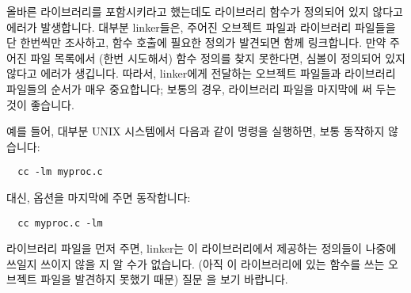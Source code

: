 \begin{faq}
	올바른 라이브러리를 포함시키라고 했는데도 라이브러리 함수가
	정의되어 있지 않다고 에러가 발생합니다.
\A
	대부분 linker들은, 주어진 오브젝트 파일과 라이브러리 파일들을
        단 한번씩만 조사하고, 함수 호출에 필요한 정의가 발견되면 함께
        링크합니다. 만약 주어진 파일 목록에서 (한번 시도해서) 함수 정의를
        찾지 못한다면, 심볼이 정의되어 있지 않다고 에러가 생깁니다.
        따라서, linker에게 전달하는 오브젝트 파일들과 라이브러리 파일들의
        순서가 매우 중요합니다; 보통의 경우, 라이브러리 파일을 마지막에 
        써 두는 것이 좋습니다.

        예를 들어, 대부분 UNIX 시스템에서 다음과 같이 명령을 실행하면,
        보통 동작하지 않습니다:
\begin{verbatim}
  cc -lm myproc.c
\end{verbatim}
	\noindent 대신,  옵션을 마지막에 주면 동작합니다:
\begin{verbatim}
  cc myproc.c -lm
\end{verbatim}
	라이브러리 파일을 먼저 주면, linker는 이 라이브러리에서 제공하는
        정의들이 나중에 쓰일지 쓰이지 않을 지 알 수가 없습니다. (아직 이
        라이브러리에 있는 함수를 쓰는 오브젝트 파일을 발견하지 못했기 때문)
        질문 을 보기 바랍니다.
\end{faq}

